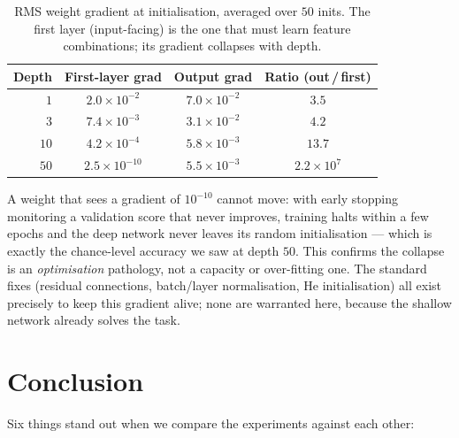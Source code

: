 \documentclass[11pt]{article}
\begin{document}
\begin{table}[H]
\centering
\caption{RMS weight gradient at initialisation, averaged over $50$ inits.
The first layer (input-facing) is the one that must learn feature
combinations; its gradient collapses with depth.}
\label{tab:grad}
\begin{tabular}{rccc}
\toprule
\textbf{Depth} & \textbf{First-layer grad} & \textbf{Output grad}
    & \textbf{Ratio (out\,/\,first)} \\
\midrule
$1$  & $2.0\times10^{-2}$  & $7.0\times10^{-2}$ & $3.5$ \\
$3$  & $7.4\times10^{-3}$  & $3.1\times10^{-2}$ & $4.2$ \\
$10$ & $4.2\times10^{-4}$  & $5.8\times10^{-3}$ & $13.7$ \\
$50$ & $2.5\times10^{-10}$ & $5.5\times10^{-3}$ & $2.2\times10^{7}$ \\
\bottomrule
\end{tabular}
\end{table}

A weight that sees a gradient of $10^{-10}$ cannot move: with early stopping
monitoring a validation score that never improves, training halts within a
few epochs and the deep network never leaves its random initialisation ---
which is exactly the chance-level accuracy we saw at depth $50$. This
confirms the collapse is an \emph{optimisation} pathology, not a capacity or
over-fitting one. The standard fixes (residual connections, batch/layer
normalisation, He initialisation) all exist precisely to keep this gradient
alive; none are warranted here, because the shallow network already solves
the task.

\section{Conclusion}
\label{sec:conclusion}

Six things stand out when we compare the experiments against each other:
\end{document}
